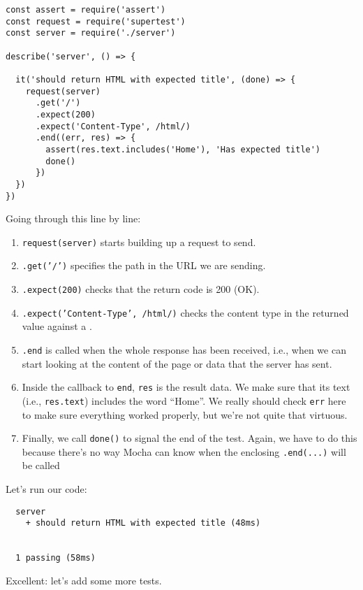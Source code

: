 \begin{verbatim}
const assert = require('assert')
const request = require('supertest')
const server = require('./server')

describe('server', () => {

  it('should return HTML with expected title', (done) => {
    request(server)
      .get('/')
      .expect(200)
      .expect('Content-Type', /html/)
      .end((err, res) => {
        assert(res.text.includes('Home'), 'Has expected title')
        done()
      })
  })
})
\end{verbatim}

Going through this line by line:

\begin{enumerate}
\item
  \texttt{request(server)} starts building up a request to send.
\item
  \texttt{.get('/')} specifies the path in the URL we are sending.
\item
  \texttt{.expect(200)} checks that the return code is 200 (OK).
\item
  \texttt{.expect('Content-Type',\ /html/)}
  checks the content type in the returned value against
  a .
\item
  \texttt{.end} is called when the whole response has been received,
  i.e., when we can start looking at the content of the page or data
  that the server has sent.
\item
  Inside the callback to \texttt{end},
  \texttt{res} is the result data.
  We make sure that its text (i.e., \texttt{res.text}) includes the word ``Home''.
  We really should check \texttt{err} here to make sure everything worked properly,
  but we're not quite that virtuous.
\item
  Finally, we call \texttt{done()} to signal the end of the test.
  Again,
  we have to do this because there's no way Mocha can know
  when the enclosing \texttt{.end(...)} will be called
\end{enumerate}

Let's run our code:

\begin{verbatim}
  server
    + should return HTML with expected title (48ms)


  1 passing (58ms)
\end{verbatim}

Excellent: let's add some more tests.

